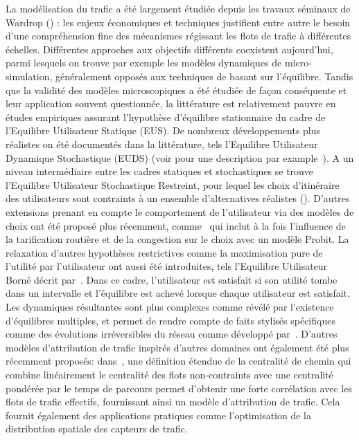 {La modélisation du trafic a été largement étudiée depuis les travaux séminaux de Wardrop (\cite{wardrop1952road}) : les enjeux économiques et techniques justifient entre autre le besoin d'une compréhension fine des mécanismes régissant les flots de trafic à différentes échelles. Différentes approches aux objectifs différents coexistent aujourd'hui, parmi lesquels on trouve par exemple les modèles dynamiques de micro-simulation, généralement opposés aux techniques de basant sur l'équilibre. Tandis que la validité des modèles microscopiques a été étudiée de façon conséquente et leur application souvent questionnée, la littérature est relativement pauvre en études empiriques assurant l'hypothèse d'équilibre stationnaire du cadre de l'Equilibre Utilisateur Statique (EUS). De nombreux développements plus réalistes on été documentés dans la littérature, tels l'Equilibre Utilisateur Dynamique Stochastique (EUDS) (voir pour une description par example~\cite{han2003dynamic}). A un niveau intermédiaire entre les cadres statiques et stochastiques se trouve l'Equilibre Utilisateur Stochastique Restreint, pour lequel les choix d'itinéraire des utilisateurs sont contraints à un ensemble d'alternatives réalistes (\cite{rasmussen2015stochastic}). D'autres extensions prenant en compte le comportement de l'utilisateur via des modèles de choix ont été proposé plus récemment, comme~\cite{zhang2013dynamic} qui inclut à la fois l'influence de la tarification routière et de la congestion sur le choix avec un modèle Probit. La relaxation d'autres hypothèses restrictives comme la maximisation pure de l'utilité par l'utilisateur ont aussi été introduites, tels l'Equilibre Utilisateur Borné décrit par~\cite{mahmassani1987boundedly}. Dans ce cadre, l'utilisateur est satisfait si son utilité tombe dans un intervalle et l'équilibre est achevé lorsque chaque utilisateur est satisfait. Les dynamiques résultantes sont plus complexes comme révélé par l'existence d'équilibres multiples, et permet de rendre compte de faits stylisés spécifiques comme des évolutions irréversibles du réseau comme développé par~\cite{guo2011bounded}. D'autres modèles d'attribution de trafic inspirés d'autres domaines ont également été plus récemment proposés: dans~\cite{puzis2013augmented}, une définition étendue de la centralité de chemin qui combine linéairement le centralité des flots non-contraints avec une centralité pondérée par le temps de parcours permet d'obtenir une forte corrélation avec les flots de trafic effectifs, fournissant ainsi un modèle d'attribution de trafic. Cela fournit également des applications pratiques comme l'optimisation de la distribution spatiale des capteurs de trafic.
}

